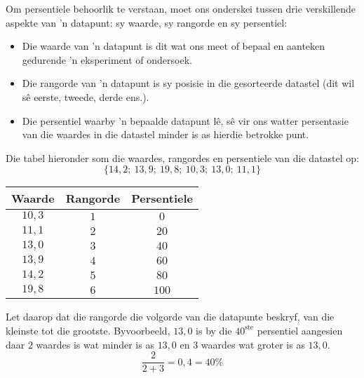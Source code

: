 Om persentiele behoorlik te verstaan, moet ons onderskei tussen drie verskillende aspekte van ’n datapunt: sy waarde, sy rangorde en sy persentiel:
\begin{itemize}
 \item Die waarde van ’n datapunt is dit wat ons meet of bepaal en aanteken gedurende ’n eksperiment of ondersoek.
\item Die rangorde van ’n datapunt is sy posisie in die gesorteerde datastel (dit wil sê eerste, tweede, derde ens.).  
\item Die persentiel waarby ’n bepaalde datapunt lê, sê vir ons watter persentasie van die waardes in die datastel minder is as hierdie betrokke punt.
\end{itemize}
\par
   Die tabel hieronder som die waardes, rangordes en persentiele van die datastel op:
  \begin{equation*}
    \{14,2;\ 13,9;\ 19,8;\ 10,3;\ 13,0;\ 11,1\}
  \end{equation*}

  \begin{center}
    \begin{tabular}{|c|c|c|} \hline

      \textbf{Waarde} & \textbf{Rangorde} & \textbf{Persentiele} \\\hline

      $10,3$  & $1$    & $0$ \\\hline
      $11,1$  & $2$    & $20$ \\\hline
      $13,0$  & $3$    & $40$ \\\hline
      $13,9$  & $4$    & $60$ \\\hline
      $14,2$  & $5$    & $80$ \\\hline
      $19,8$  & $6$    & $100$ \\\hline

    \end{tabular}
  \end{center}

 Let daarop dat die rangorde die volgorde van die datapunte beskryf, van die kleinste tot die grootste. Byvoorbeeld, $13,0$ is by die $40^{\mathrm{ste}}$ persentiel aangesien daar $2$ waardes is wat minder is as $13,0$ en $3$ waardes wat groter is as $13,0$. 
  \begin{equation*}
    \frac{2}{2+3} = 0,4 = 40\%
  \end{equation*}

